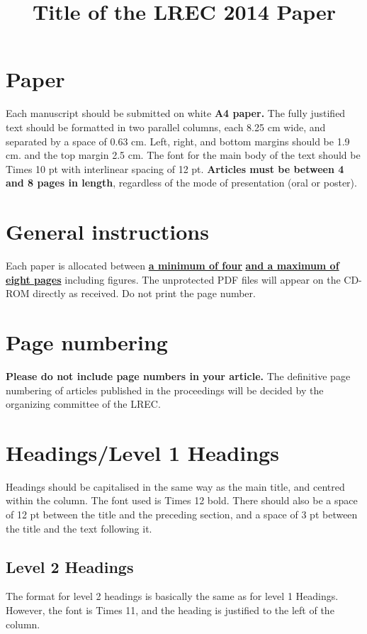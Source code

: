 \documentclass[10pt, a4paper]{article}
\title{Title of the LREC 2014 Paper}
\begin{document}
\maketitleabstract

\section{Paper}
Each manuscript should be submitted on white \textbf{A4 paper.} The fully justified text should be formatted in two parallel columns, each 8.25 cm wide, and separated by a space of 0.63 cm. Left, right, and bottom margins should be 1.9 cm. and the top margin 2.5 cm. The font for the main body of the text should be Times 10 pt with interlinear spacing of 12 pt.
\textbf{Articles must be between 4 and 8 pages in length}, regardless of the mode of presentation (oral or poster).

\section{General instructions}

Each paper is allocated between \underline{\textbf{a mi\-ni\-mum of four}} \textbf{\underline{and a maximum of eight pages} } including figures. \newline The unprotected PDF files will appear on the CD-ROM directly as received. Do not print the page number.

\section{Page numbering}

\textbf{Please do not include page numbers in your article.} The definitive page numbering of articles published in the proceedings will be decided by the organizing committee of the LREC.

\section{Headings/Level 1 Headings}

Headings should be capitalised in the same way as the main title, and centred within the column. The font used is Times 12 bold. There should also be a space of 12 pt between the title and the preceding section, and a space of 3 pt between the title and the text following it.

\subsection{Level 2 Headings}

The format for level 2 headings is basically the same as for level 1 Headings. However, the font is Times 11, and the heading is justified to the left of the column.
\end{document}
